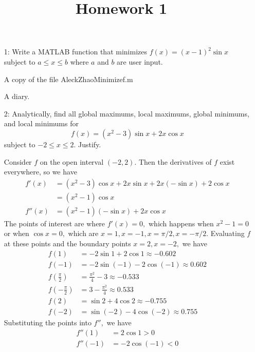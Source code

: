 \documentclass{article}
\begin{document}
\title{Homework 1}
\maketitle
\thispagestyle{fancy}

\begin{itemize}
	\item[1:] Write a MATLAB function that minimizes $f(x)=(x-1)^2\sin x$ subject to $a\le x\le b$ where $a$ and $b$ are user input.
		\begin{enumerate}[a)]
			\ii A copy of the file AleckZhaoMinimizef.m
				\lstset{language=Matlab}
				 
			\ii A diary.
				
		\end{enumerate}

		
		\newpage

	\item[2:] Analytically, find all global maximums, local maximums, global minimums, and local minimums for \[f(x)=(x^2-3)\sin x+2x\cos x\] subject to $-2\le x\le2.$ Justify.
		\begin{soln}
			Consider $f$ on the open interval $(-2, 2).$ Then the derivatives of $f$ exist everywhere, so we have 
			\begin{align*}
				f'(x) &= (x^2-3)\cos x + 2x\sin x + 2x(-\sin x) + 2\cos x \\
				&= (x^2-1)\cos x \\
				f''(x) &= (x^2-1)(-\sin x) + 2x\cos x
			\end{align*}
			The points of interest are where $f'(x)=0,$ which happens when $x^2-1=0$ or when $\cos x=0,$ which are $x=1, x=-1, x=\pi/2, x=-\pi/2.$ Evaluating $f$ at these points and the boundary points $x=2, x=-2,$ we have
			\begin{align*}
				f(1) &= -2\sin 1+2\cos 1 \approx -0.602\\
				f(-1) &= -2\sin(-1)-2\cos(-1)  \approx 0.602 \\
				f\left( \frac{\pi}{2} \right) &= \frac{\pi^2}{4}-3 \approx -0.533\\
				f\left( -\frac{\pi}{2} \right) &= 3-\frac{\pi^2}{4} \approx 0.533\\
				f(2) &= \sin2 + 4\cos 2 \approx -0.755\\
				f(-2) &= \sin(-2)-4\cos(-2) \approx 0.755
			\end{align*} Substituting the points into $f'',$ we have
			\begin{align*}
				f''(1) &= 2\cos 1 > 0 \\
				f''(-1) &= -2\cos(-1) < 0 \\

\end{align*}
\end{soln}
\end{itemize}
\end{document}
